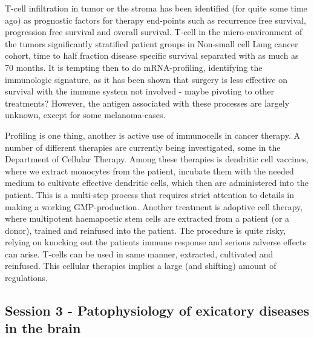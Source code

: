 \documentclass[12p]{article}
\begin{document}
T-cell infiltration in tumor or the stroma has been identified (for quite some time ago) as prognostic factors for therapy end-points such as recurrence free survival, progression free survival and overall survival.
T-cell in the micro-environment of the tumors significantly stratified patient groups in Non-small cell Lung cancer cohort, time to half fraction disease specific survival separated with as much as 70 months.
It is tempting then to do mRNA-profiling, identifying the immunologic signature, as it has been shown that surgery is less effective on survival with the immune system not involved - maybe pivoting to other treatments?
However, the antigen associated with these processes are largely unknown, except for some melanoma-cases.

Profiling is one thing, another is active use of immunocells in cancer therapy.
A number of different therapies are currently being investigated, some in the Department of Cellular Therapy.
Among these therapies is dendritic cell vaccines, where we extract monocytes from the patient, incubate them with the needed medium to cultivate effective dendritic cells, which then are administered into the patient.
This is a multi-step process that requires strict attention to details in making a working GMP-production.
Another treatment is adoptive cell therapy, where multipotent haemapoetic stem cells are extracted from a patient (or a donor), trained and reinfused into the patient.
The procedure is quite risky, relying on knocking out the patients immune response and serious adverse effects can arise.
T-cells can be used in same manner, extracted, cultivated and reinfused.
This cellular therapies implies a large (and shifting) amount of regulations.

\subsection*{Session 3 - Patophysiology of exicatory diseases in the brain}
\end{document}
